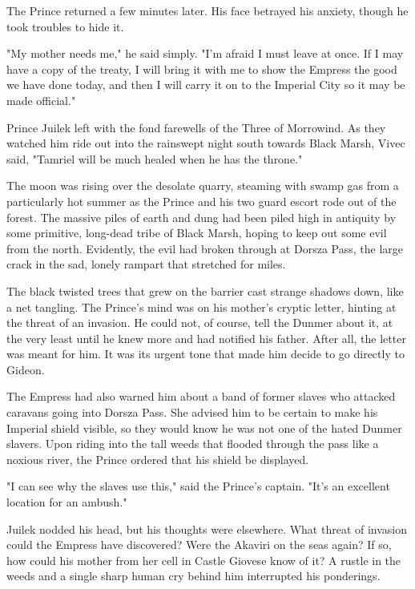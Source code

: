 The Prince returned a few minutes later. His face betrayed his anxiety, though he took troubles to hide it.

"My mother needs me," he said simply. "I'm afraid I must leave at once. If I may have a copy of the treaty, I will bring it with me to show the Empress the good we have done today, and then I will carry it on to the Imperial City so it may be made official."

Prince Juilek left with the fond farewells of the Three of Morrowind. As they watched him ride out into the rainswept night south towards Black Marsh, Vivec said, "Tamriel will be much healed when he has the throne."

The moon was rising over the desolate quarry, steaming with swamp gas from a particularly hot summer as the Prince and his two guard escort rode out of the forest. The massive piles of earth and dung had been piled high in antiquity by some primitive, long-dead tribe of Black Marsh, hoping to keep out some evil from the north. Evidently, the evil had broken through at Dorsza Pass, the large crack in the sad, lonely rampart that stretched for miles.

The black twisted trees that grew on the barrier cast strange shadows down, like a net tangling. The Prince's mind was on his mother's cryptic letter, hinting at the threat of an invasion. He could not, of course, tell the Dunmer about it, at the very least until he knew more and had notified his father. After all, the letter was meant for him. It was its urgent tone that made him decide to go directly to Gideon.

The Empress had also warned him about a band of former slaves who attacked caravans going into Dorsza Pass. She advised him to be certain to make his Imperial shield visible, so they would know he was not one of the hated Dunmer slavers. Upon riding into the tall weeds that flooded through the pass like a noxious river, the Prince ordered that his shield be displayed.

"I can see why the slaves use this," said the Prince's captain. "It's an excellent location for an ambush."

Juilek nodded his head, but his thoughts were elsewhere. What threat of invasion could the Empress have discovered? Were the Akaviri on the seas again? If so, how could his mother from her cell in Castle Giovese know of it? A rustle in the weeds and a single sharp human cry behind him interrupted his ponderings.

